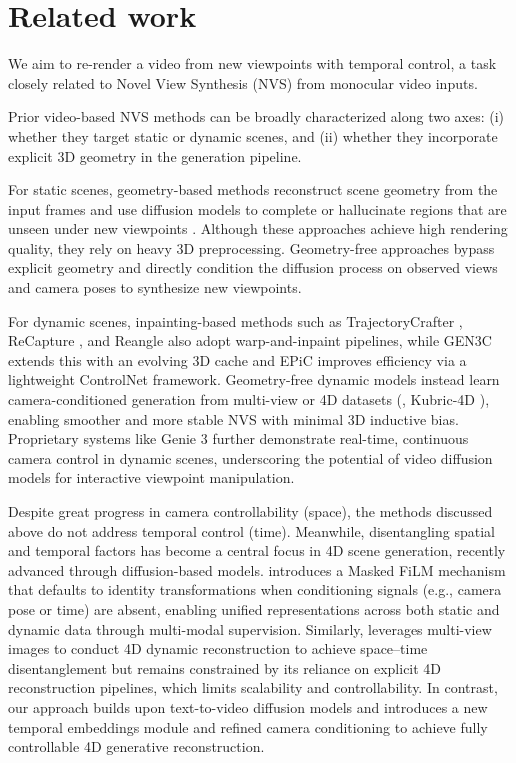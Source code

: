 \section{Related work}

We aim to re-render a video from new viewpoints with temporal control, a task closely related to Novel View Synthesis (NVS) from monocular video inputs.




Prior video-based NVS methods can be broadly characterized along two axes: (i) whether they target static or dynamic scenes, and (ii) whether they incorporate explicit 3D geometry in the generation pipeline.


For static scenes, geometry-based methods reconstruct scene geometry from the input frames and use diffusion models to complete or hallucinate regions that are unseen under new viewpoints \cite{yu2024viewcrafter,Ren2025,Jeong2025,wu2025video}.
Although these approaches achieve high rendering quality, they rely on heavy 3D preprocessing.
Geometry-free approaches \cite{Bai2025,Zhou2025,vanhoorick2024gcd} bypass explicit geometry and directly condition the diffusion process on observed views and camera poses to synthesize new viewpoints.


For dynamic scenes, inpainting-based methods such as TrajectoryCrafter \cite{YU2025}, ReCapture \cite{Zhang2024}, and Reangle \cite{Jeong2025} also adopt warp-and-inpaint pipelines, while GEN3C \cite{Ren2025} extends this with an evolving 3D cache and EPiC \cite{zun2025epic} improves efficiency via a lightweight ControlNet framework.
Geometry-free dynamic models \cite{Bai2025,bai2024syncammaster,vanhoorick2024gcd, wang20254realv2, Wang_2025_CVPR} instead learn camera-conditioned generation from multi-view or 4D datasets (\eg, Kubric-4D \cite{greff2021kubric}), enabling smoother and more stable NVS with minimal 3D inductive bias.
Proprietary systems like Genie 3 \cite{parker-holder2025genie3} further demonstrate real-time, continuous camera control in dynamic scenes, underscoring the potential of video diffusion models for interactive viewpoint manipulation.


Despite great progress in camera controllability (space), 
the methods discussed above do not address temporal control (time).
Meanwhile, disentangling spatial and temporal factors has become a central focus in 4D scene generation, recently advanced through diffusion-based models.
\fourdim \cite{watson2025controllingspacetimediffusion} introduces a Masked FiLM mechanism that defaults to identity transformations when conditioning signals (e.g., camera pose or time) are absent, enabling unified representations across both static and dynamic data through multi-modal supervision. Similarly, \catfourd \cite{Wu2024} leverages multi-view images to conduct 4D dynamic reconstruction to achieve space–time disentanglement but remains constrained by its reliance on explicit 4D reconstruction pipelines, which limits scalability and controllability. 
In contrast, our approach builds upon text-to-video diffusion models and introduces a new temporal embeddings module and refined camera conditioning to achieve fully controllable 4D generative reconstruction. 


